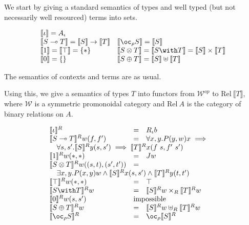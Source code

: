 We start by giving a standard semantics of types and well typed (but not necessarily well resourced) terms into sets.

\begin{displaymath}
  \begin{array}{ll}
    \llbracket \base \rrbracket = A_\base \\
    \llbracket \fun{S}{T} \rrbracket = \llbracket S \rrbracket \rightarrow \llbracket T \rrbracket &
    \llbracket \excl{\rho}{S} \rrbracket = \llbracket S \rrbracket \\
    \llbracket \tensorOne \rrbracket = \llbracket \withTOne \rrbracket = \{*\} &
    \llbracket \tensor{S}{T} \rrbracket = \llbracket \withT{S}{T} \rrbracket = \llbracket S \rrbracket \times \llbracket T \rrbracket \\
    \llbracket \sumTZero \rrbracket = \{\} &
    \llbracket \sumT{S}{T} \rrbracket = \llbracket S \rrbracket \uplus \llbracket T \rrbracket \\
  \end{array}
\end{displaymath}

The semantics of contexts and terms are as usual.

Using this, we give a semantics of types $T$ into functors from $\mathcal{W}^{op}$ to $\mathrm{Rel}\ \llbracket T \rrbracket$, where $\mathcal{W}$ is a symmetric promonoidal category and $\mathrm{Rel}\ A$ is the category of binary relations on $A$.

\begin{displaymath}
  \begin{array}{lll}
    \llbracket \base \rrbracket^R & = & R_\base b\\
    \llbracket \fun{S}{T} \rrbracket^R w (f, f') & = & \forall x,y. P(y,w)x \implies \phantom{X} \\
    \quad \forall s,s'. \llbracket S \rrbracket^R y (s, s') \implies \llbracket T \rrbracket^R x (f\ s, f'\ s') \span \span \\
    \llbracket \tensorOne \rrbracket^R w (*, *) & = & J w \\
    \llbracket \tensor{S}{T} \rrbracket^R w ((s, t), (s', t')) & = & \\
    \quad \exists x,y. P(x,y)w \wedge \llbracket S \rrbracket^R x (s, s') \wedge \llbracket T \rrbracket^R y (t, t') \span \span \\
    \llbracket \withTOne \rrbracket^R w (*, *) & = & \top \\
    \llbracket \withT{S}{T} \rrbracket^R w & = & \llbracket S \rrbracket^R w \times_R \llbracket T \rrbracket^R w \\
    \llbracket \sumTZero \rrbracket^R w (s, s') & \mathrm{impossible} \span \\
    \llbracket \sumT{S}{T} \rrbracket^R w & = & \llbracket S \rrbracket^R w \uplus_R \llbracket T \rrbracket^R w \\
    \llbracket \excl{\rho}{S} \rrbracket^R & = & \oc_\rho \llbracket S \rrbracket^R \\
  \end{array}
\end{displaymath}

